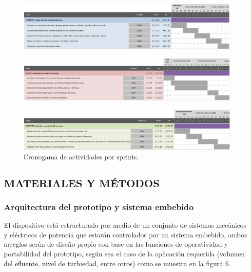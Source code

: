 \documentclass[conference]{IEEEtran}
\begin{document}
	\begin{figure}[!htbp]
	\centering
	\includegraphics[width=\columnwidth]{fig5_5.jpg}
	\end{figure}

	\begin{figure}[!htbp]
	\centering
	\includegraphics[width=\columnwidth]{fig5_6.jpg}
	\end{figure}

	\begin{figure}[!htbp]
	\centering
	\includegraphics[width=\columnwidth]{fig5_7.jpg}
	\caption{Cronogama de actividades por sprints.}
	\end{figure}

	\subsection{MATERIALES Y MÉTODOS}
	
	\subsubsection{Arquitectura del prototipo y sistema embebido}
	
	El dispositivo está estructurado por medio de un conjunto de sistemas mecánicos y eléctricos de potencia que estarán controlados por un sistema embebido, ambos arreglos serán de diseño propio con base en las funciones de operatividad y portabilidad del prototipo, según sea el caso de la aplicación requerida (volumen del efluente, nivel de turbiedad, entre otros) como se muestra en la figura 6.
	
\end{document}
